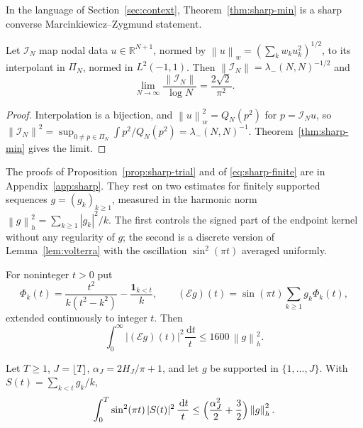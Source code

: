 \documentclass{siamart251216}
\newcommand{\Pn}{\Pi}
\newcommand{\R}{\mathbb R}
\newcommand{\norm}[1]{\left\lVert#1\right\rVert}
\newcommand{\dd}{\,\mathrm d}
\begin{document}
In the language of Section~\ref{sec:context}, Theorem~\ref{thm:sharp-min}
is a sharp converse Marcinkiewicz--Zygmund statement.

\begin{corollary}\label{cor:interp-norm}
Let $\mathcal I_N$ map nodal data $u\in\R^{N+1}$, normed by
$\norm u_w=(\sum_kw_ku_k^2)^{1/2}$, to its interpolant in $\Pn_N$, normed in
$L^2(-1,1)$. Then $\norm{\mathcal I_N}=\lambda_-(N,N)^{-1/2}$ and
\[
 \lim_{N\to\infty}\frac{\norm{\mathcal I_N}}{\log N}=\frac{2\sqrt2}{\pi^2}.
\]
\end{corollary}

\begin{proof}
Interpolation is a bijection, and $\norm u_w^2=Q_N(p^2)$ for
$p=\mathcal I_Nu$, so
$\norm{\mathcal I_N}^2=\sup_{0\ne p\in\Pn_N}\int p^2/Q_N(p^2)=\lambda_-(N,N)^{-1}$.
Theorem~\ref{thm:sharp-min} gives the limit.
\end{proof}

The proofs of Proposition~\ref{prop:sharp-trial} and of
\eqref{eq:sharp-finite} are in Appendix~\ref{app:sharp}. They rest on
two estimates for finitely supported sequences $g=(g_k)_{k\ge1}$,
measured in the harmonic norm
$\norm g_h^2=\sum_{k\ge1}|g_k|^2/k$. The first controls the signed
part of the endpoint kernel without any regularity of $g$; the second is
a discrete version of Lemma~\ref{lem:volterra} with the oscillation
$\sin^2(\pi t)$ averaged uniformly.

\begin{lemma}\label{lem:signed-remainder}%
For noninteger $t>0$ put
\[
 \Phi_k(t)=\frac{t^2}{k(t^2-k^2)}-\frac{\boldsymbol1_{k<t}}k,\qquad
 (\mathcal Eg)(t)=\sin(\pi t)\sum_{k\ge1}g_k\Phi_k(t),
\]
extended continuously to integer $t$. Then
\[
 \int_0^\infty|(\mathcal Eg)(t)|^2\frac{\dd t}t\le1600\,\norm g_h^2 .
\]
\end{lemma}

\begin{lemma}\label{lem:discrete-primitive}%
Let $T\ge1$, $J=\lfloor T\rfloor$, $\alpha_J=2H_J/\pi+1$, and let $g$ be
supported in $\{1,\dots,J\}$. With $S(t)=\sum_{k<t}g_k/k$,
\[
 \int_0^T\sin^2(\pi t)\,|S(t)|^2\,\frac{\dd t}t
 \le\Bigl(\frac{\alpha_J^2}2+\frac32\Bigr)\norm g_h^2 .
\]
\end{lemma}
\end{document}
